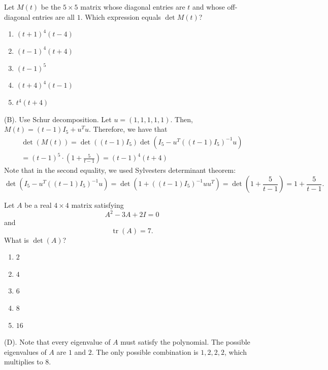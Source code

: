 \begin{exercise}
Let $M(t)$ be the $5\times5$ matrix whose diagonal entries are $t$ and whose
off-diagonal entries are all $1$. Which expression equals $\det M(t)$?
\begin{enumerate}[label=(\Alph*)]
    \item $(t+1)^4(t-4)$
    \item $(t-1)^4(t+4)$
    \item $(t-1)^5$
    \item $(t+4)^4(t-1)$
    \item $t^4(t+4)$
\end{enumerate}
\end{exercise}
\begin{solution}
(B). Use Schur decomposition. Let $u = (1,1,1,1,1)$. Then, $M(t) = (t - 1)I_5 + u^Tu$.
Therefore, we have that 
\begin{multline*}
\det(M(t)) = \det((t - 1)I_5) \det(I_5 - u^T\left((t - 1)I_5\right)^{-1}u)\\
= (t-1)^5\cdot (1 + \frac{5}{t - 1}) = (t-1)^4(t + 4)
\end{multline*}
Note that in the second equality, we used Sylvesters determinant theorem:
\[
\det(I_5 - u^T\left((t - 1)I_5\right)^{-1}u)
= \det(1 + \left((t - 1)I_5\right)^{-1}uu^T)
= \det(1 + \frac{5}{t - 1})
= 1 + \frac{5}{t - 1}.
\]
\end{solution}

\begin{exercise}
Let $A$ be a real $4\times4$ matrix satisfying
\[
A^2-3A+2I=0
\]
and
\[
\operatorname{tr}(A)=7.
\]
What is $\det(A)$?
\begin{enumerate}[label=(\Alph*)]
    \item $2$
    \item $4$
    \item $6$
    \item $8$
    \item $16$
\end{enumerate}
\end{exercise}
\begin{solution}
(D). Note that every eigenvalue of $A$ must satisfy the polynomial. 
The possible eigenvalues of $A$ are $1$ and $2$. The only possible combination
is $1,2,2,2$, which multiplies to $8$.
\end{solution}

